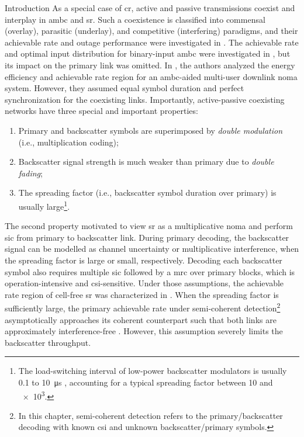 \begin{section}{Introduction}
	As a special case of \gls{cr}, active and passive transmissions coexist and interplay in \gls{ambc} and \gls{sr}.
	Such a coexistence is classified into commensal (overlay), parasitic (underlay), and competitive (interfering) paradigms, and their achievable rate and outage performance were investigated in \cite{Guo2019b,Ding2020}.
	The achievable rate and optimal input distribution for binary-input \gls{ambc} were investigated in \cite{Qian2019b}, but its impact on the primary link was omitted.
	In \cite{Hassani2023}, the authors analyzed the energy efficiency and achievable rate region for an \gls{ambc}-aided multi-user downlink \gls{noma} system.
	However, they assumed equal symbol duration and perfect synchronization for the coexisting links.
	Importantly, active-passive coexisting networks have three special and important properties:
	\begin{enumerate}
		\item Primary and backscatter symbols are superimposed by \emph{double modulation} (i.e., multiplication coding);
		\item Backscatter signal strength is much weaker than primary due to \emph{double fading};
		\item The spreading factor (i.e., backscatter symbol duration over primary) is usually large\footnote{The load-switching interval of low-power backscatter modulators is usually \num{0.1} to \qty{10}{\us} \cite{Torres2021}, accounting for a typical spreading factor between \num{10} and \num{e3}.}.
	\end{enumerate}
	The second property motivated \cite{Long2020a,Liang2020,Guo2019b,Ding2020,Hassani2023,Zhou2019a,Wu2021a,Xu2021a,Yang2021a,Yang2018,Han2021,Zhang2022,Dai2023} to view \gls{sr} as a multiplicative \gls{noma} and perform \gls{sic} from primary to backscatter link.
	During primary decoding, the backscatter signal can be modelled as channel uncertainty or multiplicative interference, when the spreading factor is large or small, respectively.
	Decoding each backscatter symbol also requires multiple \gls{sic} followed by a \gls{mrc} over primary blocks, which is operation-intensive and \gls{csi}-sensitive.
	Under those assumptions, the achievable rate region of cell-free \gls{sr} was characterized in \cite{Dai2023}.
	When the spreading factor is sufficiently large, the primary achievable rate under semi-coherent detection\footnote{In this chapter, semi-coherent detection refers to the primary/backscatter decoding with known \gls{csi} and unknown backscatter/primary symbols.} asymptotically approaches its coherent counterpart such that both links are approximately interference-free \cite{Long2020a}.
	However, this assumption severely limits the backscatter throughput.


\end{section}
